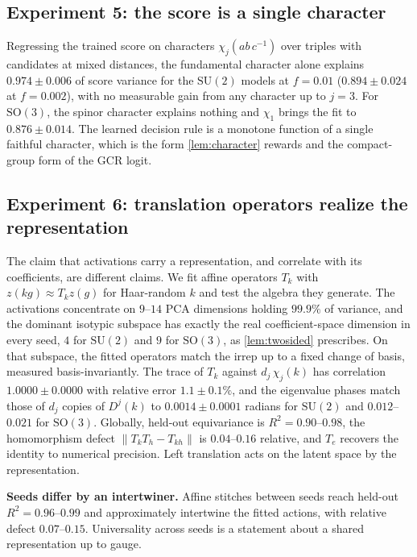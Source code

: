 \documentclass{article}
\newcommand{\SU}{\mathrm{SU}}
\newcommand{\SO}{\mathrm{SO}}
\begin{document}
\subsection{Experiment 5: the score is a single character}

Regressing the trained score on characters
$\chi_j(ab\,c^{-1})$ over triples with candidates at mixed distances,
the fundamental character alone explains $0.974 \pm 0.006$ of score
variance for the $\SU(2)$ models at $f = 0.01$ ($0.894 \pm 0.024$ at
$f = 0.002$), with no measurable gain from any character up to
$j = 3$. For $\SO(3)$, the spinor character explains nothing and
$\chi_1$ brings the fit to $0.876 \pm 0.014$. The learned decision
rule is a monotone function of a single faithful character, which is
the form \cref{lem:character} rewards and the compact-group form of
the GCR logit.

\subsection{Experiment 6: translation operators realize the
representation}

The claim that activations carry a representation, and correlate with
its coefficients, are different claims. We fit affine operators $T_k$
with $z(kg) \approx T_k z(g)$ for Haar-random $k$ and test the
algebra they generate. The activations concentrate on $9$--$14$ PCA
dimensions holding $99.9\%$ of variance, and the dominant isotypic
subspace has exactly the real coefficient-space dimension in every
seed, $4$ for $\SU(2)$ and $9$ for $\SO(3)$, as \cref{lem:twosided}
prescribes. On that subspace, the fitted operators match the irrep up
to a fixed change of basis, measured basis-invariantly. The trace of
$T_k$ against $d_j\,\chi_j(k)$ has correlation
$1.0000 \pm 0.0000$ with relative error $1.1 \pm 0.1\%$, and the
eigenvalue phases match those of $d_j$ copies of $D^j(k)$ to
$0.0014 \pm 0.0001$ radians for $\SU(2)$ and $0.012$--$0.021$ for
$\SO(3)$. Globally, held-out equivariance is $R^2 = 0.90$--$0.98$,
the homomorphism defect
$\lVert T_k T_h - T_{kh}\rVert$ is $0.04$--$0.16$ relative, and
$T_e$ recovers the identity to numerical precision. Left translation
acts on the latent space by the representation.

\textbf{Seeds differ by an intertwiner.} Affine stitches between
seeds reach held-out $R^2 = 0.96$--$0.99$ and approximately
intertwine the fitted actions, with relative defect $0.07$--$0.15$.
Universality across seeds is a statement about a shared
representation up to gauge.
\end{document}
